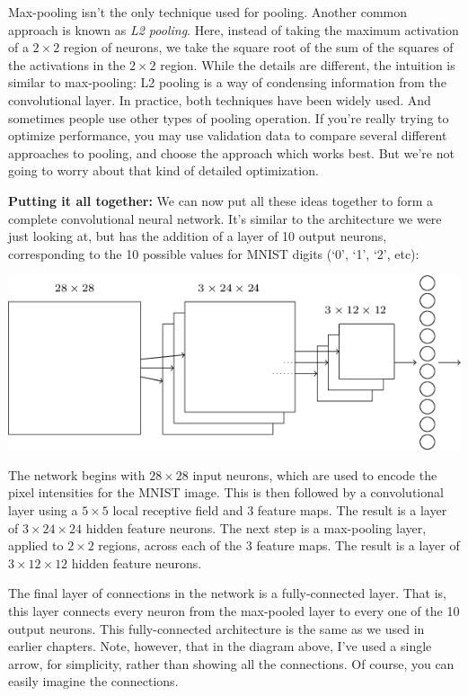 \documentclass[a4paper,twoside,10pt]{book}
\begin{document}
Max-pooling isn't the only technique used for pooling. Another common approach is known as \textit{L2 pooling}. Here, instead of taking the maximum activation of a $2\times2$ region of neurons, we take the square root of the sum of the squares of the activations in the $2\times2$ region. While the details are different, the intuition is similar to max-pooling: L2 pooling is a way of condensing information from the convolutional layer. In practice, both techniques have been widely used. And sometimes people use other types of pooling operation. If you're really trying to optimize performance, you may use validation data to compare several different approaches to pooling, and choose the approach which works best. But we're not going to worry about that kind of detailed optimization.

\textbf{Putting it all together:} We can now put all these ideas together to form a complete convolutional neural network. It's similar to the architecture we were just looking at, but has the addition of a layer of 10 output neurons, corresponding to the 10 possible values for MNIST digits (`0', `1', `2', etc):
\begin{center}
	\includegraphics[height=0.3\linewidth]{figures/ch6/tikz49}
\end{center}
The network begins with $28\times28$ input neurons, which are used to encode the pixel intensities for the MNIST image. This is then followed by a convolutional layer using a $5\times5$ local receptive field and 3 feature maps. The result is a layer of $3\times24\times24$ hidden feature neurons. The next step is a max-pooling layer, applied to $2\times2$ regions, across each of the 3 feature maps. The result is a layer of $3\times12\times12$ hidden feature neurons.

The final layer of connections in the network is a fully-connected layer. That is, this layer connects every neuron from the max-pooled layer to every one of the 10 output neurons. This fully-connected architecture is the same as we used in earlier chapters. Note, however, that in the diagram above, I've used a single arrow, for simplicity, rather than showing all the connections. Of course, you can easily imagine the connections.
\end{document}
